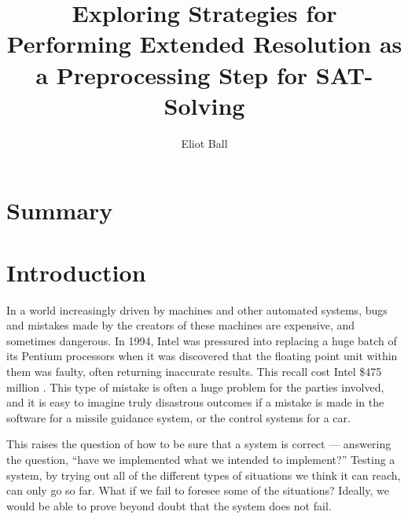 \documentclass[proof,pdftex,11pt,a4,titlepage]{article}
\newcommand\blankpage{%
    \null
    \thispagestyle{empty}%
    \addtocounter{page}{-1}%
    \newpage}
\begin{document}
\title{\textbf{Exploring Strategies for Performing Extended Resolution as a Preprocessing Step for SAT-Solving}}
\author{Eliot Ball}

\maketitle

\blankpage

\section*{Summary}



\tableofcontents

\newpage

\section{Introduction}

In a world increasingly driven by machines and other automated systems, bugs and mistakes made by the creators of these machines are expensive, and sometimes dangerous. In 1994, Intel was pressured into replacing a huge batch of its Pentium processors when it was discovered that the floating point unit within them was faulty, often returning inaccurate results. This recall cost Intel \$475 million \cite{Nicely:2008}. This type of mistake is often a huge problem for the parties involved, and it is easy to imagine truly disastrous outcomes if a mistake is made in the software for a missile guidance system, or the control systems for a car.

This raises the question of how to be sure that a system is correct --- answering the question, ``have we implemented what we intended to implement?'' Testing a system, by trying out all of the different types of situations we think it can reach, can only go so far. What if we fail to foresee some of the situations? Ideally, we would be able to prove beyond doubt that the system does not fail.
\end{document}
